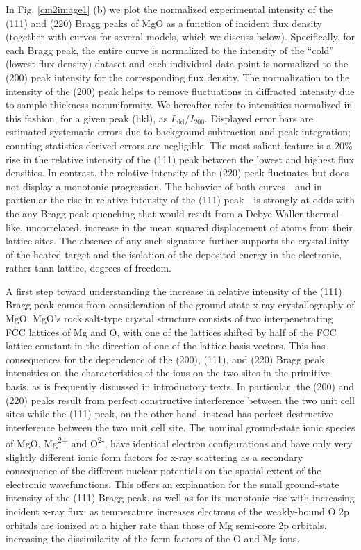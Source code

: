 In Fig. \ref{cm2image1} (b) we plot the normalized experimental intensity of the (111)
and (220) Bragg peaks of MgO as a function of incident flux density
(together with curves for several models, which we discuss below).
Specifically, for each Bragg peak, the entire curve is normalized to the
intensity of the ``cold'' (lowest-flux density) dataset and each
individual data point is normalized to the (200) peak intensity for the
corresponding flux density. The normalization to the intensity of the
(200) peak helps to remove fluctuations in diffracted intensity due to
sample thickness nonuniformity. We hereafter refer to intensities
normalized in this fashion, for a given peak (hkl), as
\(I_{\text{hkl}}/I_{200}\). Displayed error bars are estimated
systematic errors due to background subtraction and peak integration;
counting statistics-derived errors are negligible. The most salient
feature is a 20\% rise in the relative intensity of the (111) peak
between the lowest and highest flux densities. In contrast, the relative
intensity of the (220) peak fluctuates but does not display a monotonic
progression. The behavior of both curves---and in particular the rise in
relative intensity of the (111) peak---is strongly at odds with the any
Bragg peak quenching that would result from a Debye-Waller thermal-like,
uncorrelated, increase in the mean squared displacement of atoms from
their lattice sites. The absence of any such signature further supports
the crystallinity of the heated target and the isolation of the
deposited energy in the electronic, rather than lattice, degrees of
freedom.

\FloatBarrier

A first step toward understanding the increase in relative intensity of
the (111) Bragg peak comes from consideration of the ground-state x-ray
crystallography of MgO. MgO's rock salt-type crystal structure consists
of two interpenetrating FCC lattices of Mg and O, with one of the
lattices shifted by half of the FCC lattice constant in the direction of
one of the lattice basis vectors. This has consequences for the
dependence of the (200), (111), and (220) Bragg peak intensities on the
characteristics of the ions on the two sites in the primitive basis, as
is frequently discussed in introductory texts. \cite{kittel2005introduction} In particular,
the (200) and (220) peaks result from perfect constructive interference
between the two unit cell sites while the (111) peak, on the other hand,
instead has perfect destructive interference between the two unit cell
site. The nominal ground-state ionic species of MgO,
Mg\textsuperscript{2+} and O\textsuperscript{2-}, have identical
electron configurations and have only very slightly different ionic form
factors for x-ray scattering as a secondary consequence of the different
nuclear potentials on the spatial extent of the electronic
wavefunctions. This offers an explanation for the small ground-state
intensity of the (111) Bragg peak, as well as for its monotonic rise
with increasing incident x-ray flux: as temperature increases electrons
of the weakly-bound O 2p orbitals are ionized at a higher rate than
those of Mg semi-core 2p orbitals, increasing the dissimilarity of the
form factors of the O and Mg ions.

